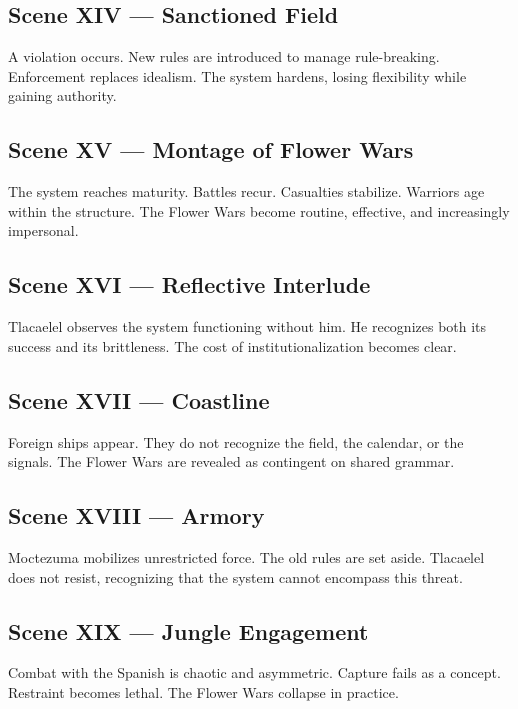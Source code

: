 \documentclass[12pt]{article}
\begin{document}
\subsection*{Scene XIV — Sanctioned Field}

A violation occurs. New rules are introduced to manage rule-breaking. Enforcement replaces idealism. The system hardens, losing flexibility while gaining authority.

\subsection*{Scene XV — Montage of Flower Wars}

The system reaches maturity. Battles recur. Casualties stabilize. Warriors age within the structure. The Flower Wars become routine, effective, and increasingly impersonal.

\subsection*{Scene XVI — Reflective Interlude}

Tlacaelel observes the system functioning without him. He recognizes both its success and its brittleness. The cost of institutionalization becomes clear.

\subsection*{Scene XVII — Coastline}

Foreign ships appear. They do not recognize the field, the calendar, or the signals. The Flower Wars are revealed as contingent on shared grammar.

\subsection*{Scene XVIII — Armory}

Moctezuma mobilizes unrestricted force. The old rules are set aside. Tlacaelel does not resist, recognizing that the system cannot encompass this threat.

\subsection*{Scene XIX — Jungle Engagement}

Combat with the Spanish is chaotic and asymmetric. Capture fails as a concept. Restraint becomes lethal. The Flower Wars collapse in practice.
\end{document}
